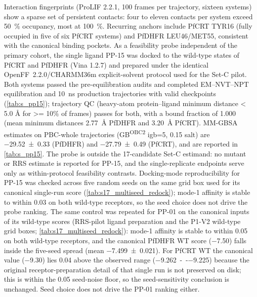 \documentclass[journal=jcisd8,manuscript=suppinfo,layout=traditional]{achemso}
\begin{document}
Interaction fingerprints (ProLIF 2.2.1, \num{100} frames per trajectory, sixteen systems) show a sparse set of persistent contacts: four to eleven contacts per system exceed \qty{50}{\percent} occupancy, most at \qty{100}{\percent}. Recurring anchors include PfCRT TYR16 (fully occupied in five of six PfCRT systems) and PfDHFR LEU46/MET55, consistent with the canonical binding pockets. As a feasibility probe independent of the primary cohort, the single ligand PP-15 was docked to the wild-type states of PfCRT and PfDHFR (Vina 1.2.7) and prepared under the identical OpenFF~2.2.0/CHARMM36m explicit-solvent protocol used for the Set-C pilot. Both systems passed the pre-equilibration audits and completed EM--NVT--NPT equilibration and \qty{10}{ns} production trajectories with valid checkpoints (\cref{tab:s_pp15}); trajectory QC (heavy-atom protein--ligand minimum distance \num{< 5.0} \si{\angstrom} for \num{>= 10}\% of frames) passes for both, with a bound fraction of \num{1.000} (mean minimum distances \qty{2.77}{\angstrom} PfDHFR and \qty{3.20}{\angstrom} PfCRT). MM-GBSA estimates on PBC-whole trajectories (GB\textsuperscript{OBC2} igb=5, \qty{0.15}{\molar} salt) are \qty{-29.52 \pm 0.33}{\kcalmol} (PfDHFR) and \qty{-27.79 \pm 0.49}{\kcalmol} (PfCRT), and are reported in \cref{tab:s_pp15}. The probe is outside the 17-candidate Set-C estimand: no mutant or RRS estimate is reported for PP-15, and the single-replicate endpoints serve only as within-protocol feasibility contrasts. Docking-mode reproducibility for PP-15 was checked across five random seeds on the same grid box used for its canonical single-run score (\cref{tab:s17_multiseed_redock}); mode-1 affinity is stable to within \qty{0.03}{\kcalmol} on both wild-type receptors, so the seed choice does not drive the probe ranking. The same control was repeated for PP-01 on the canonical inputs of its wild-type scores (RRS-pilot ligand preparation and the P1-V2 wild-type grid boxes; \cref{tab:s17_multiseed_redock}): mode-1 affinity is stable to within \qty{0.05}{\kcalmol} on both wild-type receptors, and the canonical PfDHFR WT score (\qty{-7.50}{\kcalmol}) falls inside the five-seed spread (mean \qty{-7.499 \pm 0.021}{\kcalmol}). For PfCRT WT the canonical value (\qty{-9.30}{\kcalmol}) lies \qty{0.04}{\kcalmol} above the observed range (\qty{-9.262}{--}\qty{-9.225}{\kcalmol}) because the original receptor-preparation detail of that single run is not preserved on disk; this is within the \qty{0.05}{\kcalmol} seed-noise floor, so the seed-sensitivity conclusion is unchanged. Seed choice does not drive the PP-01 ranking either.
\end{document}
